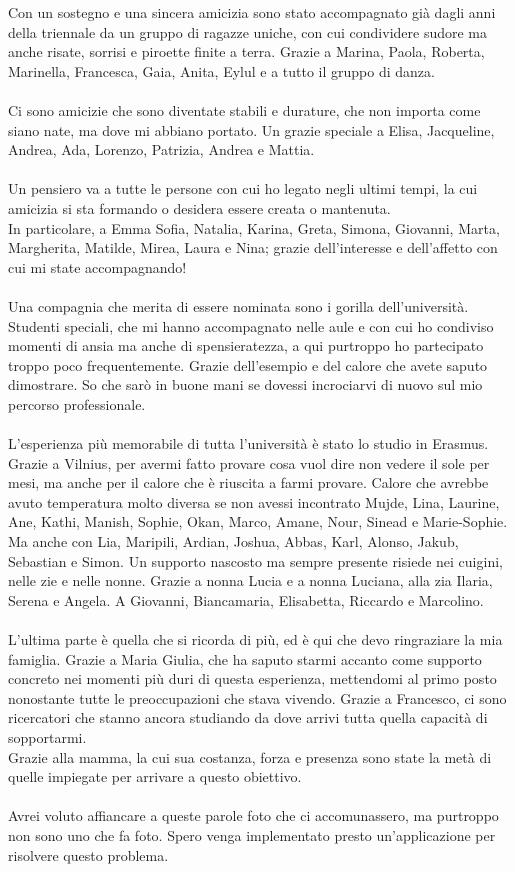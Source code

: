 Con un sostegno e una sincera amicizia
sono stato accompagnato già dagli anni della triennale
da un gruppo di ragazze uniche,
con cui condividere sudore ma anche risate,
sorrisi e piroette finite a terra.
Grazie a Marina, Paola, Roberta, Marinella,
Francesca, Gaia, Anita, Eylul e a tutto il gruppo di danza.\\
\\
Ci sono amicizie che sono diventate stabili e durature,
che non importa come siano nate, ma dove mi abbiano portato.
Un grazie speciale a Elisa, Jacqueline, Andrea, Ada, Lorenzo, Patrizia, Andrea e Mattia.\\
\\
Un pensiero va a tutte le persone con cui ho legato negli ultimi tempi,
la cui amicizia si sta formando o desidera essere creata o mantenuta.\\
In particolare, 
a Emma Sofia, Natalia, Karina, Greta, Simona, 
Giovanni, Marta, Margherita, Matilde, Mirea, Laura e Nina;
grazie dell'interesse e dell'affetto con cui mi state accompagnando!\\
\\ 
Una compagnia che merita di essere nominata sono i gorilla dell'università.
Studenti speciali, che mi hanno accompagnato nelle aule e
con cui ho condiviso momenti di ansia ma anche di spensieratezza,
a qui purtroppo ho partecipato troppo poco frequentemente.
Grazie dell'esempio e del calore che avete saputo dimostrare.
So che sarò in buone mani se dovessi incrociarvi di nuovo sul mio percorso professionale.\\
\\
L'esperienza più memorabile di tutta l'università è stato lo studio in Erasmus.
Grazie a Vilnius, per avermi fatto provare cosa vuol dire non vedere il sole per mesi,
ma anche per il calore che è riuscita a farmi provare.
Calore che avrebbe avuto temperatura molto diversa se non avessi incontrato
Mujde, Lina, Laurine, Ane, Kathi, Manish, Sophie, Okan, Marco, Amane, Nour, Sinead e Marie-Sophie.
Ma anche con Lia, Maripili, Ardian, Joshua, Abbas, Karl, Alonso, Jakub, Sebastian e Simon.
\clearpage
Un supporto nascosto ma sempre presente 
risiede nei cuigini, nelle zie e nelle nonne.
Grazie a nonna Lucia e a nonna Luciana,
alla zia Ilaria, Serena e Angela.
A Giovanni, Biancamaria, Elisabetta, Riccardo e Marcolino.\\
\\
L'ultima parte è quella che si ricorda di più,
ed è qui che devo ringraziare la mia famiglia.
Grazie a Maria Giulia, 
che ha saputo starmi accanto come supporto concreto 
nei momenti più duri di questa esperienza,
mettendomi al primo posto nonostante tutte le preoccupazioni che stava vivendo.
Grazie a Francesco,
ci sono ricercatori che stanno ancora studiando
da dove arrivi tutta quella capacità di sopportarmi.\\
Grazie alla mamma,
la cui sua costanza, forza e presenza
sono state la metà di quelle impiegate per arrivare a questo obiettivo.\\
\\
Avrei voluto affiancare a queste parole foto che ci accomunassero,
ma purtroppo non sono uno che fa foto.
Spero venga implementato presto un'applicazione per risolvere questo problema.
   
